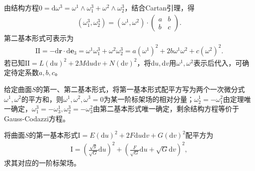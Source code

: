 \documentclass[../../main.tex]{subfiles}%
\begin{document}
由结构方程$0=\mathrm{d}\omega^3=\omega^1\wedge\omega_1^3+\omega^2\wedge\omega_2^3$，结合Cartan引理，得
\begin{align}
(\omega_1^3,\omega_2^3)=(\omega^1,\omega^2)\cdot\begin{pmatrix}a&b\\b&c\end{pmatrix}.
\label{eq:cartan-lemma-omega3}
\end{align}
第二基本形式可表示为
\begin{align}
\mathrm{II}=-\mathrm{d}\boldsymbol{r}\cdot\mathrm{d}\boldsymbol{e}_3=\omega^1\omega_1^3+\omega^2\omega_2^3=a(\omega^1)^2+2b\omega^1\omega^2+c(\omega^2)^2.
\label{eq:ii-omega-form}
\end{align}
若已知$\mathrm{II}=L(\mathrm{d}u)^2+2M\mathrm{d}u\mathrm{d}v+N(\mathrm{d}v)^2$，将$\mathrm{d}u,\mathrm{d}v$用$\omega^1,\omega^2$表示后代入，可确定待定系数$a,b,c$。

\begin{proposition}
给定曲面$S$的第一、第二基本形式，将第一基本形式配平方写为两个一次微分式$\omega^1,\omega^2$的平方和，则$\omega^1,\omega^2,\omega^3=0$为某一阶标架场的相对分量；$\omega_2^1=-\omega_1^2$由定理唯一确定，$\omega_1^3=-\omega_3^1,\omega_2^3=-\omega_3^2$由第二基本形式唯一确定，剩余结构方程等价于Gauss-Codazzi方程。
\end{proposition}

\begin{example}
将曲面$S$的第一基本形式$\mathrm{I}=E(\mathrm{d}u)^2+2F\mathrm{d}u\mathrm{d}v+G(\mathrm{d}v)^2$配平方为
\begin{align*}
\mathrm{I}=\left(\frac{\sqrt{g}}{\sqrt{G}}\mathrm{d}u\right)^2+\left(\frac{F}{\sqrt{G}}\mathrm{d}u+\sqrt{G}\mathrm{d}v\right)^2,
\end{align*}
求其对应的一阶标架场。
\end{example}
\end{document}
